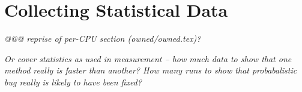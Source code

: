 
\chapter{Collecting Statistical Data}

\emph{@@@ reprise of per-CPU section (owned/owned.tex)?}

\emph{Or cover statistics as used in measurement -- how much data to show that
one method really is faster than another?  How many runs to show that
probabalistic bug really is likely to have been fixed?}
